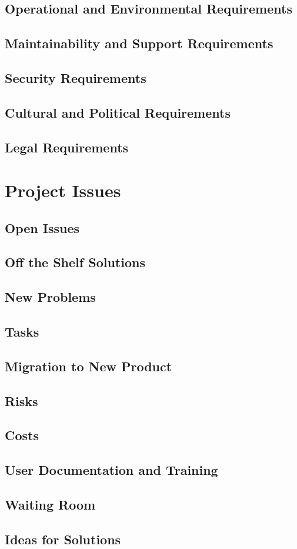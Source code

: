 \documentclass[12pt]{article}
\begin{document}
\subsection{Operational and Environmental Requirements}
\subsection{Maintainability and Support Requirements}
\subsection{Security Requirements}
\subsection{Cultural and Political Requirements}
\subsection{Legal Requirements}

\section{Project Issues}
\subsection{Open Issues}
\subsection{Off the Shelf Solutions}
\subsection{New Problems}
\subsection{Tasks}
\subsection{Migration to New Product}
\subsection{Risks}
\subsection{Costs}
\subsection{User Documentation and Training}
\subsection{Waiting Room}
\subsection{Ideas for Solutions}
\end{document}
